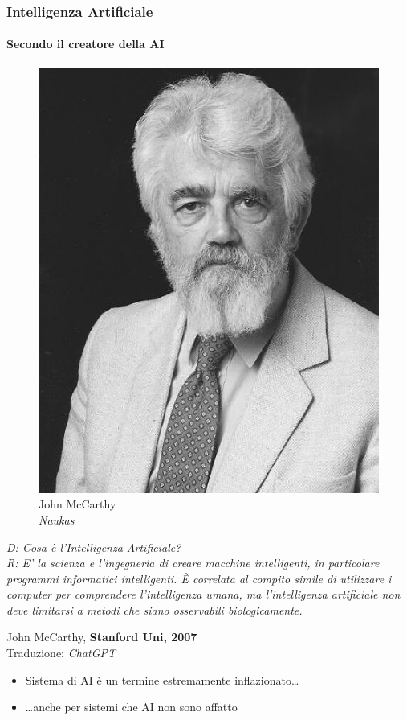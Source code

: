 \begin{frame}[t,fragile] \frametitle{Intelligenza Artificiale}
{\scriptsize
	\onslide<1->
		\framesubtitle{Secondo il creatore della AI}
		\vspace*{3pt}
		\begin{minipage}[t]{\textwidth}
			\begin{minipage}[t]{0.45\textwidth}
				\centering
				\begin{figure}[ht]
					\includegraphics[width=.73\textwidth]{img/John-McCarthy.jpg}
					{\tiny\\John McCarthy\\\vspace*{-1pt}\textit{\textcopyright Naukas}}
				\end{figure}
			\end{minipage}
		    \begin{minipage}[t]{0.5\textwidth}
				\renewcommand{\epigraphsize}{\small}
				\setlength{\afterepigraphskip}{0pt}
				\setlength{\beforeepigraphskip}{5pt}
				\setlength{\epigraphwidth}{\textwidth}
				\epigraph{
					\textit{\alert{D:} Cosa è l'Intelligenza Artificiale?\\
					\alert{R:} E' la scienza e l'ingegneria di creare macchine intelligenti, in particolare programmi informatici intelligenti. È correlata al compito simile di utilizzare i computer per comprendere l'intelligenza umana, ma l'intelligenza artificiale non deve limitarsi a metodi che siano osservabili biologicamente.}}{John McCarthy, \textbf{Stanford Uni, 2007}\\Traduzione: \textit{\textcopyright ChatGPT}}
			\end{minipage}
		\end{minipage}
}
	\begin{itemize}[leftmargin=10pt,align=right]
		\item[\alert{\faHandORight}] Sistema di AI è un termine estremamente inflazionato\ldots 
		\onslide<3->\item[\alert{\faHandORight}] \ldots anche per sistemi che AI non sono affatto
	\end{itemize}
\end{frame}
